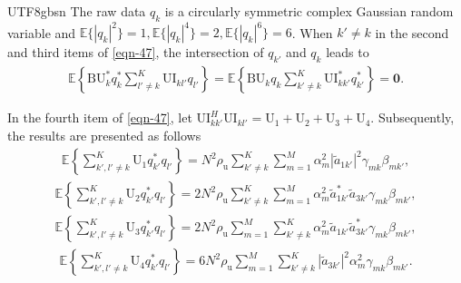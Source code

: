 \documentclass[lettersize,journal]{IEEEtran}
\begin{document}
\begin{CJK}{UTF8}{gbsn}
The raw data $q_k$ is a circularly symmetric complex Gaussian random variable and $\mathbb{E} \{ \left | q_k \right |^2 \} =1, \mathbb{E}  \{ \left | q_k \right |^4  \} =2,\mathbb{E} \{ \left | q_k \right |^6 \} =6$. When $k' \ne k$ in the second and third items of \eqref{eqn-47}, the intersection of ${q_{k'}}$ and ${q_k}$ leads to
\begin{equation}\begin{aligned}\mathbb{E}\left\{ {\text{BU}_k^ * q_k^ * \sum _{l' \ne k}^K\text{UI}_{kl'}{q_{l'}}} \right\} = \mathbb{E}\left\{ {\text{BU}_k{q_k}\sum _{k' \ne k}^K\text{UI}_{kk'}^ * q_{k'}^ * } \right\} = \mathbf{0} .\end{aligned}\end{equation}

In the fourth item of \eqref{eqn-47}, let $\text{UI}_{kk'}^H\text{UI}_{kl'} = {\text{U}_1} + {\text{U}_2} + {\text{U}_3} + {\text{U}_4}$. Subsequently, the results are presented as follows
\begin{equation}\begin{aligned}\label{eqn-54}\mathbb{E}\left\{ {\mathop \sum \limits_{k',l' \ne k}^K {\text{U}_1}q_{k'}^ * {q_{l'}}} \right\} = {N^2}{\rho _\text{u}}\mathop \sum \limits_{k' \ne k}^K \mathop \sum \limits_{m = 1}^M \alpha _m^2{\left| {{\tilde{a}_{1k'}}} \right|^2}{\gamma _{mk}}{\beta _{mk'}},\end{aligned}\end{equation}
\begin{equation}\begin{aligned}\mathbb{E}\left\{ {\mathop \sum \limits_{k',l' \ne k}^K {\text{U}_2}q_{k'}^ * {q_{l'}}} \right\} = 2{N^2}{\rho _\text{u}}\mathop \sum \limits_{k' \ne k}^K \mathop \sum \limits_{m = 1}^M \alpha _m^2\tilde{a}_{1k'}^ * {\tilde{a}_{3k'}}{\gamma _{mk}}{\beta _{mk'}},\end{aligned}\end{equation}
\begin{equation}\begin{aligned}\mathbb{E}\left\{ {\mathop \sum \limits_{k',l' \ne k}^K {\text{U}_3}q_{k'}^ * {q_{l'}}} \right\} = 2{N^2}{\rho _\text{u}}\mathop \sum \limits_{m = 1}^M \mathop \sum \limits_{k' \ne k}^K \alpha _m^2{\tilde{a}_{1k'}}\tilde{a}_{3k'}^ * {\gamma _{mk}}{\beta _{mk'}},\end{aligned}\end{equation}
\begin{equation}\begin{aligned}\label{eqn-57}\mathbb{E}\left\{ {\mathop \sum \limits_{k',l' \ne k}^K {\text{U}_4}q_{k'}^ * {q_{l'}}} \right\} = 6{N^2}{\rho _\text{u}}\mathop \sum \limits_{m = 1}^M \mathop \sum \limits_{k' \ne k}^K {\left| {{\tilde{a}_{3k'}}} \right|^2}\alpha _m^2{\gamma _{mk}}{\beta _{mk'}}.\end{aligned}\end{equation}


\end{CJK}
\end{document}
